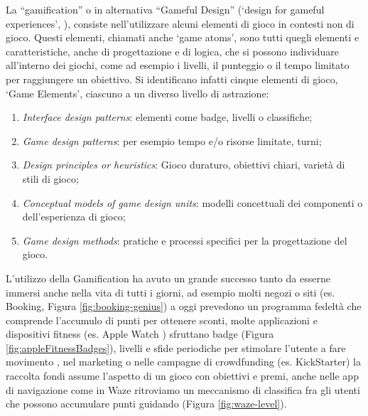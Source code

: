 La \enquote{gamification} o in alternativa \enquote{Gameful Design} (\enquote*{design for gameful experiences}, \cite{definingGamification2011}), consiste nell'utilizzare alcuni elementi di gioco in contesti non di gioco. Questi elementi, chiamati anche \enquote*{game atoms}, sono tutti quegli elementi e caratteristiche, anche di progettazione e di logica, che si possono individuare all'interno dei giochi, come ad esempio i livelli, il punteggio o il tempo limitato per raggiungere un obiettivo.
Si identificano infatti cinque elementi di gioco, \enquote*{Game Elements}, ciascuno a un diverso livello di astrazione: 

\begin{enumerate}
    \item \emph{Interface design patterns}: elementi come badge, livelli o classifiche;
    \item \emph{Game design patterns}: per esempio tempo e/o risorse limitate, turni;
    \item \emph{Design principles or heuristics}: Gioco duraturo, obiettivi chiari, varietà di stili di gioco;
    \item \emph{Conceptual models of game design units}: modelli concettuali dei componenti o dell'esperienza di gioco;
    \item \emph{Game design methods}: pratiche e processi specifici per la progettazione del gioco.
\end{enumerate}

L'utilizzo della Gamification ha avuto un grande successo tanto da esserne immersi anche nella vita di tutti i giorni, ad esempio molti negozi o siti (es. Booking, Figura \ref{fig:booking-genius}) a oggi prevedono un programma fedeltà che comprende l'accumulo di punti per ottenere sconti, molte applicazioni e dispositivi fitness (es. Apple Watch \cite{appleWatchGamification}) sfruttano badge (Figura \ref{fig:appleFitnessBadges}), livelli e sfide periodiche per stimolare l'utente a fare movimento \cite{gamification4exercise}, nel marketing o nelle campagne di crowdfunding (es. KickStarter) la raccolta fondi assume l'aspetto di un gioco con obiettivi e premi, anche nelle app di navigazione come in Waze ritroviamo un meccanismo di classifica fra gli utenti che possono accumulare punti guidando (Figura \ref{fig:waze-level}).


